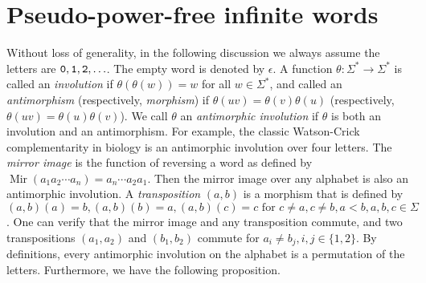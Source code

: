 \documentclass[12pt]{article}
\def\mirror{{\operatorname{Mir}}}
\def\mtt#1{{\tt #1}}
\begin{document}
\section{Pseudo-power-free infinite words}\label{section:freeword}
Without loss of generality, in the following discussion we always
assume the letters are $\mtt0,\mtt1,\mtt2,\ldots$. The empty word is
denoted by $\epsilon$. A function $\theta:\Sigma^*\to\Sigma^*$ is
called an \emph{involution} if $\theta(\theta(w))=w$ for all
$w\in\Sigma^*$, and called an \emph{antimorphism} (respectively,
\emph{morphism}) if $\theta(uv)=\theta(v)\theta(u)$ (respectively,
$\theta(uv)=\theta(u)\theta(v)$). We call $\theta$ an
\emph{antimorphic involution} if $\theta$ is both an involution and
an antimorphism. For example, the classic Watson-Crick
complementarity in biology is an antimorphic involution over four
letters. The \emph{mirror image} is the function of reversing a word
as defined by $\mirror(a_1a_2\cdots a_n)=a_n\cdots a_2a_1$. Then the
mirror image over any alphabet is also an antimorphic involution. A
\emph{transposition} $(a,b)$ is a morphism that is defined by
$(a,b)(a)=b,(a,b)(b)=a,(a,b)(c)=c\textrm{ for }c\neq a,c\neq
b,a<b,a,b,c\in\Sigma$. One can verify that the mirror image and any
transposition commute, and two transpositions $(a_1,a_2)$ and
$(b_1,b_2)$ commute for $a_i\neq b_j,i,j\in\{1,2\}$. By definitions,
every antimorphic involution on the alphabet is a permutation of the
letters. Furthermore, we have the following proposition.
\end{document}
